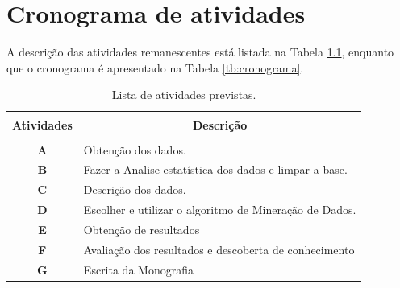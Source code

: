 \documentclass[tcc1]{uftex}
\begin{document}
\chapter{Cronograma de atividades}
A descrição das atividades remanescentes está listada na Tabela \ref{tb:atividades}, enquanto que o cronograma é apresentado na Tabela \ref{tb:cronograma}.


\begin{table}[!h]
  \centering
  \caption{Lista de atividades previstas.}\label{tb:atividades}
  \begin{tabular}{cp{9.4cm}}
    \hline \hline &\\[-0.4cm]
    {\bf Atividades} & \multicolumn{1}{c}{\bf Descrição} \\
    \hline
    &\\[-0.4cm]
    \textbf{A} & Obtenção dos dados.\\[0.2cm]
    \textbf{B} & Fazer a Analise estatística dos dados e limpar a base.\\[0.2cm]
    \textbf{C} & Descrição dos dados.\\[0.2cm]
    \textbf{D} & Escolher e utilizar o algoritmo de Mineração de Dados.\\[0.2cm]
    \textbf{E} & Obtenção de resultados\\[0.2cm]
    \textbf{F} &  Avaliação dos resultados e descoberta de conhecimento\\[0.2cm]
    \textbf{G} &  Escrita da Monografia\\[0.2cm]
    \hline \hline
  \end{tabular}
\end{table}



\end{document}
